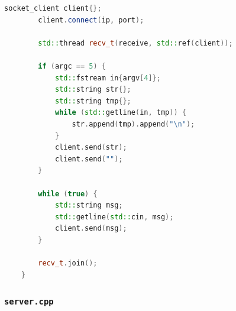 \documentclass{article}
\begin{document}
\begin{lstlisting}[language=C++]
        socket_client client{};
        client.connect(ip, port);
    
        std::thread recv_t(receive, std::ref(client));
    
        if (argc == 5) {
            std::fstream in{argv[4]};
            std::string str{};
            std::string tmp{};
            while (std::getline(in, tmp)) {
                str.append(tmp).append("\n");
            }
            client.send(str);
            client.send("");
        }
    
        while (true) {
            std::string msg;
            std::getline(std::cin, msg);
            client.send(msg);
        }
    
        recv_t.join();
    }    
\end{lstlisting}

\subsubsection{\texttt{server.cpp}}
\end{document}
